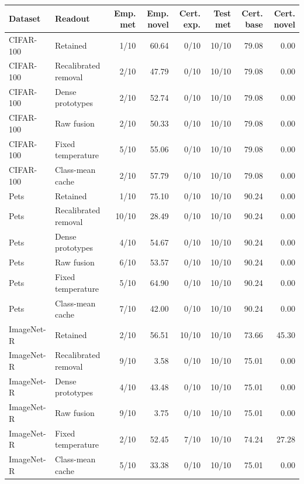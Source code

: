 \begin{tabular}{llrrrrrr}
\toprule
Dataset & Readout & Emp. met & Emp. novel & Cert. exp. & Test met & Cert. base & Cert. novel \\
\midrule
CIFAR-100 & Retained & 1/10 & 60.64 & 0/10 & 10/10 & 79.08 & 0.00 \\
CIFAR-100 & Recalibrated removal & 2/10 & 47.79 & 0/10 & 10/10 & 79.08 & 0.00 \\
CIFAR-100 & Dense prototypes & 2/10 & 52.74 & 0/10 & 10/10 & 79.08 & 0.00 \\
CIFAR-100 & Raw fusion & 2/10 & 50.33 & 0/10 & 10/10 & 79.08 & 0.00 \\
CIFAR-100 & Fixed temperature & 5/10 & 55.06 & 0/10 & 10/10 & 79.08 & 0.00 \\
CIFAR-100 & Class-mean cache & 2/10 & 57.79 & 0/10 & 10/10 & 79.08 & 0.00 \\
\midrule
Pets & Retained & 1/10 & 75.10 & 0/10 & 10/10 & 90.24 & 0.00 \\
Pets & Recalibrated removal & 10/10 & 28.49 & 0/10 & 10/10 & 90.24 & 0.00 \\
Pets & Dense prototypes & 4/10 & 54.67 & 0/10 & 10/10 & 90.24 & 0.00 \\
Pets & Raw fusion & 6/10 & 53.57 & 0/10 & 10/10 & 90.24 & 0.00 \\
Pets & Fixed temperature & 5/10 & 64.90 & 0/10 & 10/10 & 90.24 & 0.00 \\
Pets & Class-mean cache & 7/10 & 42.00 & 0/10 & 10/10 & 90.24 & 0.00 \\
\midrule
ImageNet-R & Retained & 2/10 & 56.51 & 10/10 & 10/10 & 73.66 & 45.30 \\
ImageNet-R & Recalibrated removal & 9/10 & 3.58 & 0/10 & 10/10 & 75.01 & 0.00 \\
ImageNet-R & Dense prototypes & 4/10 & 43.48 & 0/10 & 10/10 & 75.01 & 0.00 \\
ImageNet-R & Raw fusion & 9/10 & 3.75 & 0/10 & 10/10 & 75.01 & 0.00 \\
ImageNet-R & Fixed temperature & 2/10 & 52.45 & 7/10 & 10/10 & 74.24 & 27.28 \\
ImageNet-R & Class-mean cache & 5/10 & 33.38 & 0/10 & 10/10 & 75.01 & 0.00 \\
\bottomrule
\end{tabular}
